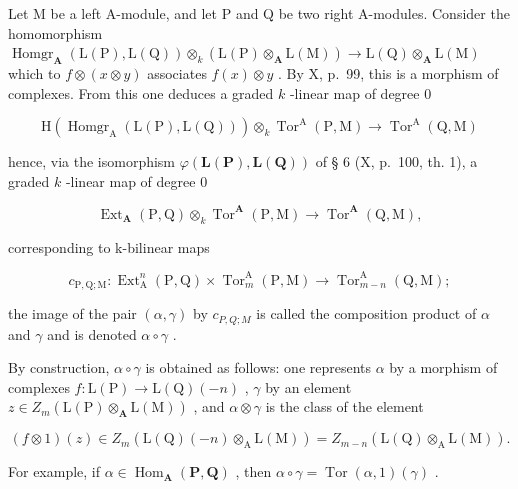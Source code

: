 Let M be a left A-module, and let P and Q be two right A-modules. Consider the homomorphism \(\operatorname{Homgr}_{\mathbf{A}}(\mathrm{L}(\mathrm{P}), \mathrm{L}(\mathrm{Q})) \otimes_{k} (\mathrm{L}(\mathrm{P}) \otimes_{\mathbf{A}} \mathrm{L}(\mathrm{M})) \to \mathrm{L}(\mathrm{Q}) \otimes_{\mathbf{A}} \mathrm{L}(\mathrm{M})\) which to \(f \otimes (x \otimes y)\) associates \(f(x) \otimes y\) . By X, p.~99, this is a morphism of complexes. From this one deduces a graded \(k\) -linear map of degree 0

\[
\mathrm{H} (\operatorname{Homgr} _ {\mathrm{A}} (\mathrm{L} (\mathrm{P}), \mathrm{L} (\mathrm{Q}))) \otimes_ {k} \operatorname{Tor} ^ {\mathrm{A}} (\mathrm{P}, \mathrm{M}) \rightarrow \operatorname{Tor} ^ {\mathrm{A}} (\mathrm{Q}, \mathrm{M})
\]

hence, via the isomorphism \(\varphi(\mathbf{L}(\mathbf{P}),\mathbf{L}(\mathbf{Q}))\) of § 6 (X, p.~100, th. 1), a graded \(k\) -linear map of degree 0

\[
\operatorname{Ext} _ {\mathbf {A}} (\mathrm{P}, \mathrm{Q}) \otimes_ {k} \operatorname{Tor} ^ {\mathbf {A}} (\mathrm{P}, \mathrm{M}) \rightarrow \operatorname{Tor} ^ {\mathbf {A}} (\mathrm{Q}, \mathrm{M}),\tag{10}
\]

corresponding to k-bilinear maps

\[
c _ {\mathrm{P}, \mathrm{Q}; \mathrm{M}}: \operatorname{Ext} _ {\mathrm{A}} ^ {n} (\mathrm{P}, \mathrm{Q}) \times \operatorname{Tor} _ {m} ^ {\mathrm{A}} (\mathrm{P}, \mathrm{M}) \rightarrow \operatorname{Tor} _ {m - n} ^ {\mathrm{A}} (\mathrm{Q}, \mathrm{M});\tag{11}
\]

the image of the pair \((\alpha, \gamma)\) by \(c_{P,Q;M}\) is called the composition product of \(\alpha\) and \(\gamma\) and is denoted \(\alpha \circ \gamma\) .

By construction, \(\alpha \circ \gamma\) is obtained as follows: one represents \(\alpha\) by a morphism of complexes \(f: \mathrm{L}(\mathrm{P}) \to \mathrm{L}(\mathrm{Q})(-n)\) , \(\gamma\) by an element \(z \in Z_m(\mathrm{L}(\mathrm{P}) \otimes_{\mathbf{A}} \mathrm{L}(\mathrm{M}))\) , and \(\alpha \otimes \gamma\) is the class of the element

\[
(f \otimes 1) (z) \in Z _ {m} (\mathrm{L} (\mathrm{Q}) (- n) \otimes_ {\mathrm{A}} \mathrm{L} (\mathrm{M})) = Z _ {m - n} (\mathrm{L} (\mathrm{Q}) \otimes_ {\mathrm{A}} \mathrm{L} (\mathrm{M})).
\]

For example, if \(\alpha \in \operatorname{Hom}_{\mathbf{A}}(\mathbf{P},\mathbf{Q})\) , then \(\alpha \circ \gamma = \operatorname{Tor}(\alpha,1)(\gamma)\) .

